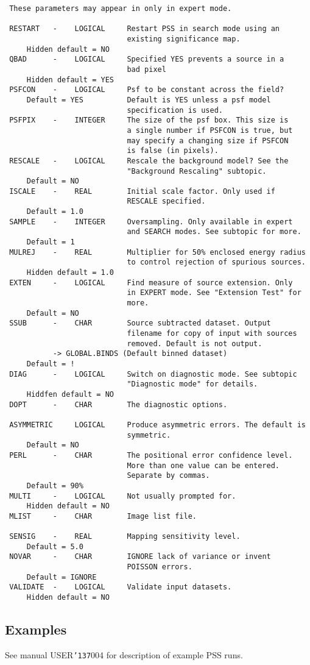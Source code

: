\documentclass{book}
\renewcommand{\_}{{\tt\char'137}}     %
\begin{document}
\begin{verbatim}
 These parameters may appear in only in expert mode.

 RESTART   -    LOGICAL     Restart PSS in search mode using an
                            existing significance map.
     Hidden default = NO
 QBAD      -    LOGICAL     Specified YES prevents a source in a
                            bad pixel
     Hidden default = YES
 PSFCON    -    LOGICAL     Psf to be constant across the field?
     Default = YES          Default is YES unless a psf model
                            specification is used.
 PSFPIX    -    INTEGER     The size of the psf box. This size is
                            a single number if PSFCON is true, but
                            may specify a changing size if PSFCON
                            is false (in pixels).
 RESCALE   -    LOGICAL     Rescale the background model? See the
                            "Background Rescaling" subtopic.
     Default = NO
 ISCALE    -    REAL        Initial scale factor. Only used if
                            RESCALE specified.
     Default = 1.0
 SAMPLE    -    INTEGER     Oversampling. Only available in expert
                            and SEARCH modes. See subtopic for more.
     Default = 1
 MULREJ    -    REAL        Multiplier for 50% enclosed energy radius
                            to control rejection of spurious sources.
     Hidden default = 1.0
 EXTEN     -    LOGICAL     Find measure of source extension. Only
                            in EXPERT mode. See "Extension Test" for
                            more.
     Default = NO
 SSUB      -    CHAR        Source subtracted dataset. Output
                            filename for copy of input with sources
                            removed. Default is not output.
           -> GLOBAL.BINDS (Default binned dataset)
     Default = !
 DIAG      -    LOGICAL     Switch on diagnostic mode. See subtopic
                            "Diagnostic mode" for details.
     Hiddfen default = NO
 DOPT      -    CHAR        The diagnostic options.

 ASYMMETRIC     LOGICAL     Produce asymmetric errors. The default is
                            symmetric.
     Default = NO
 PERL      -    CHAR        The positional error confidence level.
                            More than one value can be entered.
                            Separate by commas.
     Default = 90%
 MULTI     -    LOGICAL     Not usually prompted for.
     Hidden default = NO
 MLIST     -    CHAR        Image list file.

 SENSIG    -    REAL        Mapping sensitivity level.
     Default = 5.0
 NOVAR     -    CHAR        IGNORE lack of variance or invent
                            POISSON errors.
     Default = IGNORE
 VALIDATE  -    LOGICAL     Validate input datasets.
     Hidden default = NO
\end{verbatim}\subsection{Examples}
See manual USER\_004 for description of example PSS runs.
\end{document}
